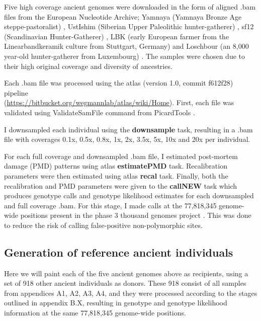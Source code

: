 {\color{red}Five} high coverage ancient genomes were downloaded in the form of aligned .bam files from the European Nucleotide Archive; Yamnaya (Yamnaya Bronze Age steppe-pastoralist) \cite{deBarrosDamgaardeaar7711}, UstIshim (Siberian Upper Paleolithic hunter-gatherer) \cite{Fu2014}, sf12 (Scandinavian Hunter-Gatherer) \cite{Gunther2018a}, LBK (early European farmer from the Linearbandkeramik culture from Stuttgart, Germany) \cite{Lazaridis2014} and Loschbour (an 8,000 year-old hunter-gatherer from Luxembourg) \cite{Lazaridis2014}. The samples were chosen due to their high original coverage and diversity of ancestries. 

Each .bam file was processed using the atlas (version 1.0, commit f612f28) pipeline \cite{Link2017} \\(\url{https://bitbucket.org/wegmannlab/atlas/wiki/Home}). First, each file was validated using ValidateSamFile command from PicardTools \cite{Picard2018toolkit}. 

I downsampled each individual using the \textbf{downsample} task, resulting in a .bam file with coverages 0.1x, 0.5x, 0.8x, 1x, 2x, 3.5x, 5x, 10x and 20x per individual. 

For each full coverage and downsampled .bam file, I estimated post-mortem damage (PMD) patterns using atlas \textbf{estimatePMD} task. Recalibration parameters were then estimated using atlas \textbf{recal} task. Finally, both the recalibration and PMD parameters were given to the \textbf{callNEW} task which produces genotype calls and genotype likelihood estimates for each downsampled and full coverage .bam. For this stage, I made calls at the 77,818,345 genome-wide positions present in the phase 3 thousand genomes project \cite{1000GenomesProjectConsortium2015}. This was done to reduce the risk of calling false-positive non-polymorphic sites.

\subsection{Generation of reference ancient individuals}

{\color{red}Here we will paint each of the five ancient genomes above as recipients, using a set of 918 other ancient individuals as donors. These 918 consist of all samples from appendices A1, A2, A3, A4, and they were processed according to the stages outlined in appendix B.X, resulting in genotype and genotype likelihood information at the same 77,818,345 genome-wide positions.}


